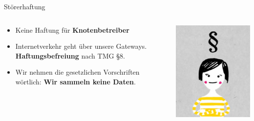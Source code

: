 \documentclass[t]{beamer}
\begin{document}
  \begin{frame}{Störerhaftung}
    \begin{columns}[T]
      \begin{column}{0.6\textwidth}
        \begin{itemize}
          \item Keine Haftung für \textbf{Knotenbetreiber}
          \item Internetverkehr geht über unsere Gateways. \textbf{Haftungsbefreiung} nach TMG \S8.
          \item Wir nehmen die gesetzlichen Vorschriften wörtlich: \textbf{Wir sammeln keine Daten}.
        \end{itemize}
      \end{column}
      \begin{column}{0.4\textwidth}
        \hspace{1em}
        \includegraphics[width=\textwidth]{images/recht}
      \end{column}
    \end{columns}
  \end{frame}
\end{document}
